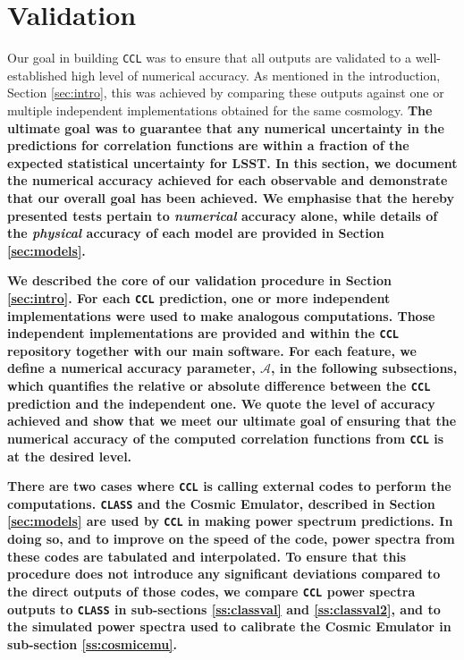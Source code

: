 \documentclass[\docopts]{\docclass}
\newcommand{\ccl}{{\tt CCL}\xspace}
\begin{document}
\section{Validation}
\label{sec:validation}

Our goal in building \ccl was to ensure that all outputs are validated to a well-established high level of numerical accuracy. As mentioned in the introduction, Section \ref{sec:intro}, this was achieved by comparing these outputs against one or multiple independent implementations obtained for the same cosmology. {\bf The ultimate goal was to guarantee that any numerical uncertainty in the predictions for correlation functions are within a fraction of the expected statistical uncertainty for LSST. In this section, we document the numerical accuracy achieved for each observable and demonstrate that our overall goal has been achieved. We emphasise that the hereby presented tests pertain to {\it numerical} accuracy alone, while details of the {\it physical} accuracy of each model are provided in Section \ref{sec:models}. }

{\bf We described the core of our validation procedure in Section \ref{sec:intro}. For each \ccl prediction, one or more independent implementations were used to make analogous computations. Those independent implementations are provided and within the \ccl repository together with our main software. For each feature, we define a numerical accuracy parameter, $\mathcal{A}$, in the following subsections, which quantifies the relative or absolute difference between the \ccl prediction and the independent one. We quote the level of accuracy achieved and show that we meet our ultimate goal of ensuring that the numerical accuracy of the computed correlation functions from \ccl is at the desired level.}

{\bf There are two cases where \ccl is calling external codes to perform the computations. {\tt CLASS} and the Cosmic Emulator, described in Section \ref{sec:models} are used by \ccl in making power spectrum predictions. In doing so, and to improve on the speed of the code, power spectra from these codes are tabulated and interpolated. To ensure that this procedure does not introduce any significant deviations compared to the direct outputs of those codes, we compare \ccl power spectra outputs to {\tt CLASS} in sub-sections \ref{ss:classval} and  \ref{ss:classval2}, and to the simulated power spectra used to calibrate the Cosmic Emulator in sub-section \ref{ss:cosmicemu}.}
\end{document}
